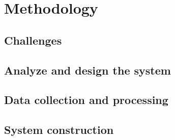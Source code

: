 \chapter{\centering Methodology}


\section{Challenges}

\section{Analyze and design the system}


\section{Data collection and processing}


\section{System construction}


